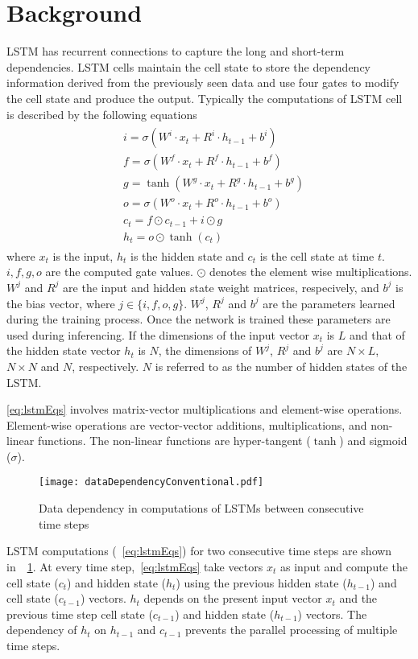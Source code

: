 \section{Background}
LSTM has recurrent connections to capture the long and short-term dependencies. LSTM cells maintain the cell state to store the dependency information derived from the previously seen data and use four gates to modify the cell state and produce the output. Typically the computations of LSTM cell is described by the following equations
\begin{align}\label{eq:lstmEqs}
	\begin{split}
		&i{=}{\sigma}(W^i{\cdot}x_t{+}R^i{\cdot}h_{t-1}{+}b^i)\\
		&f{=}{\sigma}(W^f{\cdot}x_t{+}R^f{\cdot}h_{t-1}{+}b^f)\\
		&g{=}{\tanh}(W^g{\cdot}x_t{+}R^g{\cdot}h_{t-1}{+}b^g)\\
		&o{=}{\sigma}(W^o{\cdot}x_t{+}R^o{\cdot}h_{t-1}{+}b^o)\\
		&c_{t}{=}f{\odot}c_{t-1}{+}i{\odot}g\\
		&h_{t}{=}o{\odot}{\tanh}(c_t)
	\end{split}	
\end{align}
where $x_t$ is the input, $h_t$ is the hidden state and $c_t$ is the cell state at time $t$. $i,f,g,o$ are the computed gate values. $\odot$ denotes the element wise multiplications. $W^j$ and $R^j$ are the input and hidden state weight matrices, respecively, and $b^j$ is the bias vector, where $j\in\{i,f,o,g\}$. $W^j$, $R^j$ and $b^j$ are the parameters learned during the training process. Once the network is trained these parameters are used during inferencing. 
If the dimensions of the input vector $x_t$ is $L$ and that of the hidden state vector $h_t$ is $N$, the dimensions of $W^j$, $R^j$ and $b^j$ are $N{\times}L$, $N{\times}N$ and $N$, respectively. $N$ is referred to as the number of hidden states of the LSTM. 

\eqref{eq:lstmEqs} involves matrix-vector multiplications and element-wise operations. Element-wise operations are vector-vector additions, multiplications, and non-linear functions. The non-linear functions are hyper-tangent ($\tanh$) and sigmoid ($\sigma$).
\begin{figure}[!htb]
	\centerline{\texttt{[image: dataDependencyConventional.pdf]}}
	\caption{Data dependency in computations of LSTMs between consecutive time steps}
	\label{fig:lstmComputationConv}
\end{figure}
LSTM computations (~\eqref{eq:lstmEqs}) for two consecutive time steps are shown in~\figurename{~\ref{fig:lstmComputationConv}}. At every time step,~\eqref{eq:lstmEqs} take vectors $x_t$ as input and compute the cell state ($c_t$) and hidden state ($h_t$) using the previous hidden state ($h_{t-1}$) and cell state ($c_{t-1}$) vectors. $h_t$ depends on the present input vector $x_t$ and the previous time step cell state ($c_{t-1}$) and hidden state ($h_{t-1}$) vectors. The dependency of $h_t$ on $h_{t-1}$ and $c_{t-1}$ prevents the parallel processing of multiple time steps. 


